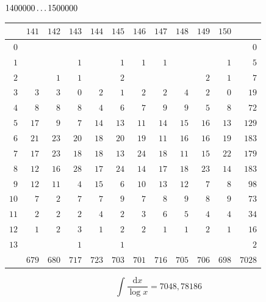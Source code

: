 \clearpage
\noindent\begin{minipage}{\linewidth}\centering
{}
\(1400000\mathinner{.\,.\,.}1500000\)\par\smallskip
\begingroup\fontsize{10.5}{11.5}\selectfont\setlength{\tabcolsep}{3.5pt}\renewcommand{\arraystretch}{1}
\begin{tabular}{r|rrrrrrrrrr|r}\hline
 & $141$ & $142$ & $143$ & $144$ & $145$ & $146$ & $147$ & $148$ & $149$ & $150$ &  \\ \hline
$0$ &  &  &  &  &  &  &  &  &  &  & $0$ \\
$1$ &  &  & $1$ &  & $1$ & $1$ & $1$ &  &  & $1$ & $5$ \\
$2$ &  & $1$ & $1$ &  & $2$ &  &  &  & $2$ & $1$ & $7$ \\
$3$ & $3$ & $3$ & $0$ & $2$ & $1$ & $2$ & $2$ & $4$ & $2$ & $0$ & $19$ \\
$4$ & $8$ & $8$ & $8$ & $4$ & $6$ & $7$ & $9$ & $9$ & $5$ & $8$ & $72$ \\
$5$ & $17$ & $9$ & $7$ & $14$ & $13$ & $11$ & $14$ & $15$ & $16$ & $13$ & $129$ \\
$6$ & $21$ & $23$ & $20$ & $18$ & $20$ & $19$ & $11$ & $16$ & $16$ & $19$ & $183$ \\
$7$ & $17$ & $23$ & $18$ & $18$ & $13$ & $24$ & $18$ & $11$ & $15$ & $22$ & $179$ \\
$8$ & $12$ & $16$ & $28$ & $17$ & $24$ & $14$ & $17$ & $18$ & $23$ & $14$ & $183$ \\
$9$ & $12$ & $11$ & $4$ & $15$ & $6$ & $10$ & $13$ & $12$ & $7$ & $8$ & $98$ \\
$10$ & $7$ & $2$ & $7$ & $7$ & $9$ & $7$ & $8$ & $9$ & $8$ & $9$ & $73$ \\
$11$ & $2$ & $2$ & $2$ & $4$ & $2$ & $3$ & $6$ & $5$ & $4$ & $4$ & $34$ \\
$12$ & $1$ & $2$ & $3$ & $1$ & $2$ & $2$ & $1$ & $1$ & $2$ & $1$ & $16$ \\
$13$ &  &  & $1$ &  & $1$ &  &  &  &  &  & $2$ \\
\hline
 & $679$ & $680$ & $717$ & $723$ & $703$ & $701$ & $716$ & $705$ & $706$ & $698$ & $7028$ \\ \hline
\end{tabular}\par\endgroup
\setlength{\abovedisplayskip}{6pt}\setlength{\belowdisplayskip}{4pt}
\[\int\frac{\mathrm{d}x}{\log x}=7048{,}78186\]
\end{minipage}


